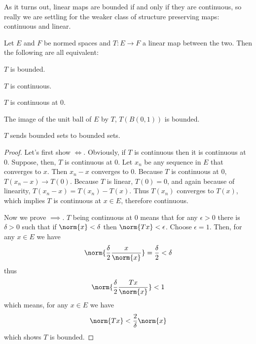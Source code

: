 \documentclass[12pt,oneside]{book}
\begin{document}
\parbreak

As it turns out, linear maps are bounded if and only if they are continuous, so really we
are settling for the weaker class of structure preserving maps: continuous and linear. 
{\def\currentprefix{prop:characterisation of bounded operators}
\begin{proposition}
	Let \( E \) and \( F \) be normed spaces and \( T \colon E \to F \) a linear map between
	the two. Then the following are all equivalent:
	\begin{points}
	\item {} \( T \) is bounded.
	\item {} \( T \) is continuous. 
	\item {} \( T \) is continuous at 0.
	\item {} The image of the unit ball of \( E \) by \( T \), \( T(B(0,1)) \) is bounded. 
	\item {} \( T \) sends bounded sets to bounded sets.
	\end{points}
\end{proposition}
\begin{proof}
	Let's first show \( \iff \). Obviously, if \( T \) is
	continuous then it is continuous at 0. Suppose, then, \( T \) is continuous at 0. Let \(
	x_n \) be any sequence in	\( E \) that converges to \( x \). Then \( x_n - x \) converges
	to 0. Because \( T \) is continuous at 0, \( T(x_n - x) \to T(0) \). Because \( T \) is
	linear, \( T(0) = 0 \), and again because of linearity, \( T(x_n - x) = T(x_n) - T(x)
	\). Thus \( T(x_n) \) converges to \( T(x) \), which implies \( T \) is continuous at \(
	x \in E \), therefore continuous. 

	Now we prove \( \implies \). \( T \) being continuous at 0
	means that for any \( \epsilon > 0 \) there is \( \delta > 0 \) such that if \( \norm{x}
	< \delta \) then \( \norm{Tx} < \epsilon \). Choose \( \epsilon = 1 \). Then, for any \(
	x \in E \) we have
	\begin{equation*}
		\norm{\frac{\delta}{2} \frac{x}{\norm{x}}} = \frac{\delta}{2} < \delta
	\end{equation*}
	thus
	\begin{equation*}
		\norm{\frac{\delta}{2}\frac{Tx}{\norm{x}}} < 1
	\end{equation*}
	which means, for any \( x \in E \) we have
	\begin{equation*}
		\norm{Tx} < \frac{2}{\delta} \norm{x}
	\end{equation*}
	which shows \( T \) is bounded.


\end{proof}}
\end{document}

